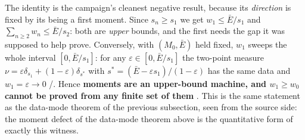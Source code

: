 The identity is the campaign's cleanest negative result, because its \emph{direction} is fixed by
its being a first moment. Since $s_n\ge s_1$ we get $w_1\le\bar E/s_1$ and
$\sum_{n\ge2}w_n\le\bar E/s_2$: both are \emph{upper} bounds, and the first needs the gap it was
supposed to help prove. Conversely, with $(M_0,\bar E)$ held fixed, $w_1$ sweeps the whole interval
$[0,\bar E/s_1]$: for any $\varepsilon\in[0,\bar E/s_1]$ the two-point measure
$\nu=\varepsilon\delta_{s_1}+(1-\varepsilon)\delta_{s^*}$ with $s^*=(\bar E-\varepsilon s_1)/(1-\varepsilon)$
has the same data and $w_1=\varepsilon\to0$ \LT/\LE. Hence \textbf{moments are an upper-bound
machine, and $w_1\ge w_0$ cannot be proved from any finite set of them} \LN. This is the same
statement as the data-mode theorem of the previous subsection, seen from the source side: the moment
defect of the data-mode theorem above is the quantitative form of exactly this witness.

